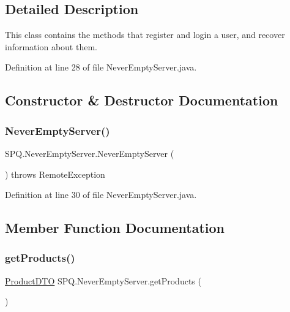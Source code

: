 \subsection{Detailed Description}
This class contains the methods that register and login a user, and recover information about them. 

Definition at line 28 of file Never\+Empty\+Server.\+java.



\subsection{Constructor \& Destructor Documentation}
\mbox{\label{class_s_p_q_1_1_never_empty_server_a5cec4d4f1ec13bf31974d58182e82170}} 
\subsubsection{\texorpdfstring{Never\+Empty\+Server()}{NeverEmptyServer()}}
{\footnotesize\ttfamily S\+P\+Q.\+Never\+Empty\+Server.\+Never\+Empty\+Server (\begin{DoxyParamCaption}{ }\end{DoxyParamCaption}) throws Remote\+Exception\hspace{0.3cm}{\ttfamily [protected]}}



Definition at line 30 of file Never\+Empty\+Server.\+java.



\subsection{Member Function Documentation}
\mbox{\label{class_s_p_q_1_1_never_empty_server_ad8c5a0afa259c6b8bcc2eb2444742ca2}} 
\subsubsection{\texorpdfstring{get\+Products()}{getProducts()}}
{\footnotesize\ttfamily \mbox{\hyperlink{class_s_p_q_1_1dto_1_1_product_d_t_o}{Product\+D\+TO}} S\+P\+Q.\+Never\+Empty\+Server.\+get\+Products (\begin{DoxyParamCaption}{ }\end{DoxyParamCaption})}

